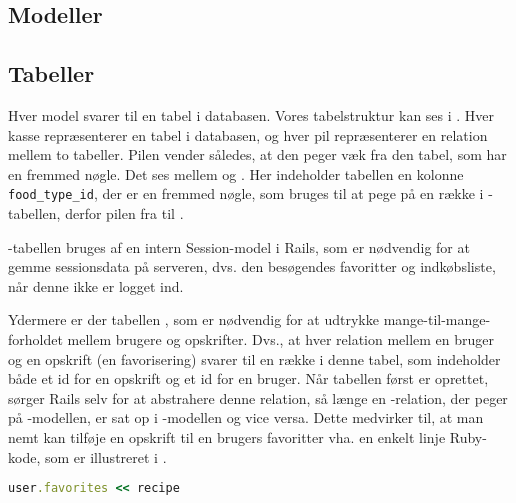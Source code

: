 \subsection{Modeller}



\subsection{Tabeller}
\label{sec:tabeller}

Hver model svarer til en tabel i databasen. Vores tabelstruktur kan ses i . Hver kasse repræsenterer en tabel i databasen, og hver pil repræsenterer en relation mellem to tabeller. Pilen vender således, at den peger væk fra den tabel, som har en fremmed nøgle. Det ses \fx mellem  og . Her indeholder tabellen  en kolonne \texttt{food\_type\_id}, der er en fremmed nøgle, som bruges til at pege på en række i -tabellen, derfor pilen fra  til .

-tabellen bruges af en intern Session-model i Rails, som er nødvendig for at gemme sessionsdata på serveren, dvs. \fx den besøgendes favoritter og indkøbsliste, når denne ikke er logget ind.

Ydermere er der tabellen , som er nødvendig for at udtrykke mange-til-mange-forholdet mellem brugere og opskrifter. Dvs., at hver relation mellem en bruger og en opskrift (en favorisering) svarer til en række i denne tabel, som indeholder både et id for en opskrift og et id for en bruger. Når tabellen først er oprettet, sørger Rails selv for at abstrahere denne relation, så længe en -relation, der peger på -modellen, er sat op i -modellen og vice versa. Dette medvirker til, at man \fx nemt kan tilføje en opskrift til en brugers favoritter vha. en enkelt linje Ruby-kode, som er illustreret i .

\begin{lstlisting}[caption={Hvis man har et \classref{User}-objekt i \texttt{user} (som f.eks. returneret med \lstinline{User.find_by_id(42)}) og et \classref{Recipe}-object i \texttt{recipe}, kan opskriften associeres med brugeren med denne linje Ruby-kode.},label=lst:rubymanytomany,language=Ruby]
user.favorites << recipe
\end{lstlisting}

